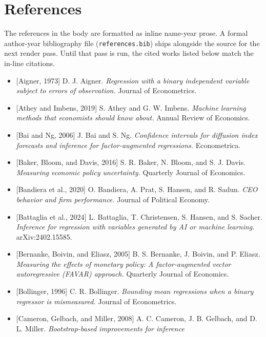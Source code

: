 \documentclass[
  12pt,
  letterpaper]{article}
\providecommand{\tightlist}{%
  \setlength{\itemsep}{0pt}\setlength{\parskip}{0pt}}
\begin{document}
\newpage

\section*{References}\label{references}

The references in the body are formatted as inline name-year prose. A
formal author-year bibliography file (\texttt{references.bib}) ships
alongside the source for the next render pass. Until that pass is run,
the cited works listed below match the in-line citations.

\begin{itemize}
\tightlist
\item
  {[}Aigner, 1973{]} D. J. Aigner. \emph{Regression with a binary
  independent variable subject to errors of observation.} Journal of
  Econometrics.
\item
  {[}Athey and Imbens, 2019{]} S. Athey and G. W. Imbens. \emph{Machine
  learning methods that economists should know about.} Annual Review of
  Economics.
\item
  {[}Bai and Ng, 2006{]} J. Bai and S. Ng. \emph{Confidence intervals
  for diffusion index forecasts and inference for factor-augmented
  regressions.} Econometrica.
\item
  {[}Baker, Bloom, and Davis, 2016{]} S. R. Baker, N. Bloom, and S. J.
  Davis. \emph{Measuring economic policy uncertainty.} Quarterly Journal
  of Economics.
\item
  {[}Bandiera et al., 2020{]} O. Bandiera, A. Prat, S. Hansen, and R.
  Sadun. \emph{CEO behavior and firm performance.} Journal of Political
  Economy.
\item
  {[}Battaglia et al., 2024{]} L. Battaglia, T. Christensen, S. Hansen,
  and S. Sacher. \emph{Inference for regression with variables generated
  by AI or machine learning.} arXiv:2402.15585.
\item
  {[}Bernanke, Boivin, and Eliasz, 2005{]} B. S. Bernanke, J. Boivin,
  and P. Eliasz. \emph{Measuring the effects of monetary policy: A
  factor-augmented vector autoregressive (FAVAR) approach.} Quarterly
  Journal of Economics.
\item
  {[}Bollinger, 1996{]} C. R. Bollinger. \emph{Bounding mean regressions
  when a binary regressor is mismeasured.} Journal of Econometrics.
\item
  {[}Cameron, Gelbach, and Miller, 2008{]} A. C. Cameron, J. B. Gelbach,
  and D. L. Miller. \emph{Bootstrap-based improvements for inference
}
\end{itemize}
\end{document}
